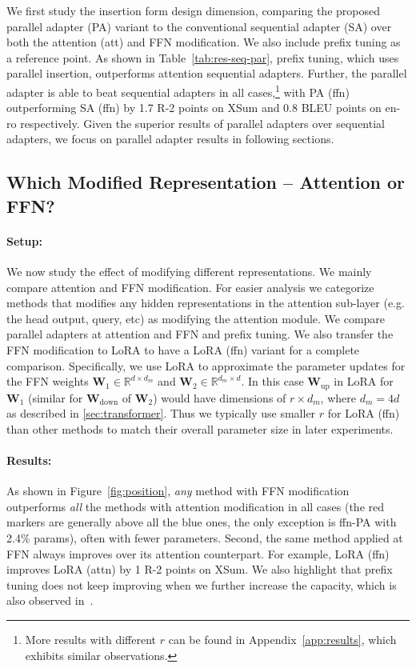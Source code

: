 We first study the insertion form design dimension, comparing the proposed parallel adapter (PA) variant to the conventional sequential adapter (SA) over both the attention (att) and FFN modification. We also include prefix tuning as a reference point. As shown in Table~\ref{tab:res-seq-par}, prefix tuning, which uses parallel insertion, outperforms attention sequential adapters. Further, the parallel adapter is able to beat sequential adapters in all cases,\footnote{More results with different $r$ can be found in Appendix~\ref{app:results}, which exhibits similar observations.} with PA (ffn) outperforming SA (ffn) by 1.7 R-2 points on XSum and 0.8 BLEU points on en-ro respectively. Given the superior results of parallel adapters over sequential adapters, we focus on parallel adapter results in following sections.

\subsection{Which Modified Representation -- Attention or FFN?}
\label{sec:exp-position}

\paragraph{Setup:}
We now study the effect of modifying different representations. We mainly compare attention and FFN modification. For easier analysis we categorize methods that modifies any hidden representations in the attention sub-layer (e.g. the head output, query, etc) as modifying the attention module. We compare parallel adapters at attention and FFN and prefix tuning. We also transfer the FFN modification to LoRA to have a LoRA (ffn) variant for a complete comparison. Specifically, we use LoRA to approximate the parameter updates for the FFN weights ${\bm{W}}_1\in {\mathbb{R}}^{d\times d_m}$ and
${\bm{W}}_2\in {\mathbb{R}}^{d_m\times d}$. In this case ${\bm{W}}_{\text{up}}$ in LoRA for ${\bm{W}}_1$ (similar for ${\bm{W}}_{\text{down}}$ of ${\bm{W}}_2$) would have dimensions of $r \times d_m$, where $d_m=4d$ as described in \textsection\ref{sec:transformer}. Thus we typically use smaller $r$ for LoRA (ffn) than other methods to match their overall parameter size in later experiments.  

\paragraph{Results:}

As shown in Figure~\ref{fig:position}, \emph{any} method with FFN modification outperforms \emph{all} the methods with attention modification in all cases (the red markers are generally above all the blue ones, the only exception is ffn-PA with 2.4\% params), often with fewer parameters. Second, the same method applied at FFN always improves over its attention counterpart. For example, LoRA (ffn) improves LoRA (attn) by 1 R-2 points on XSum. We also highlight that prefix tuning does not keep improving when we further increase the capacity, which is also observed in~\citet{li2021prefix}.

